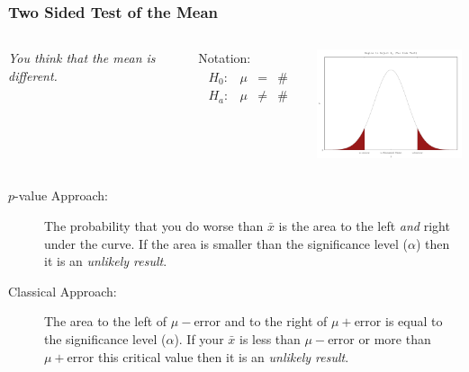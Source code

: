 \begin{frame}
  \frametitle{Two Sided Test of the Mean}

  \vspace*{-1em}

  \begin{columns}
    \textit{You think that the mean is different.}

    Notation:
    \begin{eqnarray*}
      \begin{array}{lrcl}
        H_0: & \mu & = & \# \\
        H_a: & \mu & \neq & \#
      \end{array}
    \end{eqnarray*}


    \includegraphics[width=5cm]{img/twoSideHypothesisTest}

  \end{columns}

  \begin{description}
  \item[$p$-value Approach:] The probability that you do worse than
    $\bar{x}$ is the area to the left \textit{and} right under the
    curve. If the area is smaller than the significance level
    ($\alpha$) then it is an \textit{unlikely result}.
  \item[Classical Approach:] The area to the left of
    $\mu-\mathrm{error}$ and to the right of $\mu+\mathrm{error}$ is
    equal to the significance level ($\alpha$). If your $\bar{x}$ is
    less than $\mu-\mathrm{error}$ or more than $\mu+\mathrm{error}$
    this critical value then it is an \textit{unlikely result}.
  \end{description}


\end{frame}



